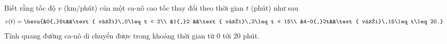 
\begin{bt}%
	Biết rằng tốc độ $v$ (km/phút) của một ca-nô cao tốc thay đổi theo thời  gian $t$ (phút) như sau
	\[v(t)=\heva{&0{,}5t&&\text{ với}\,0\leq t <  2\\
	 &1{,}2 &&\text{ với}\,2\leq t < 15\\
	&4-0{,}2t&&\text{  với}\,15\leq t\leq 20.}\]
	Tính quang đường ca-nô di chuyển được trong khoảng thời gian  từ $0$ tới $20$ phút.
\end{bt}

